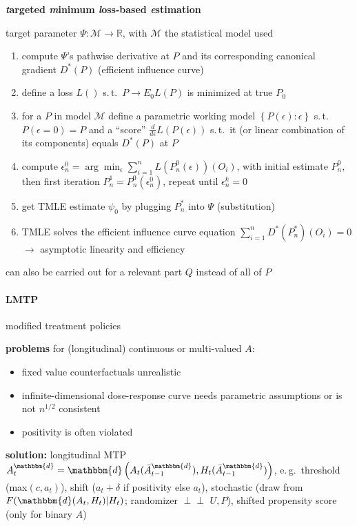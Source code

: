\documentclass[8pt,twoside]{extarticle}
\newcommand{\indep}{\perp \!\!\! \perp}
\begin{document}
\begin{multicols}{2}
 \textbf{\textit{t}argeted \textit{m}inimum \textit{l}oss-based \textit{e}stimation}


 target parameter $\Psi: \mathcal{M} \to \mathbb{R}$, with $\mathcal{M}$ the statistical model used

\begin{enumerate}[leftmargin=*, itemsep=0em, topsep=0pt, partopsep=0pt,parsep=0pt]
\item compute $\Psi$'s pathwise derivative at $P$ and its corresponding canonical gradient $D^*(P)$ (efficient influence curve)
\item define a loss $L()$ s.\,t.\ $P\to E_0L(P)$ is minimized at true $P_0$ 
\item for a $P$ in model $\mathcal{M}$ define a parametric working model $\left\{P(\epsilon):\epsilon\right\}$ s.\,t.\ $P(\epsilon=0)=P$ and a ``score'' $\frac{d}{d\epsilon}L(P(\epsilon))$ s.\,t.\ it (or linear combination of its components) equals $D^*(P)$ at $P$ 
\item  compute $\epsilon_n^0{=}\arg\min_\epsilon\! \sum_{i=1}^n \! L(P_n^0(\epsilon))(O_i)$, with initial estimate $P_n^0$, then  first iteration $P^1_n=P_n^0(\epsilon_n^0)$, repeat until $\epsilon^k_n=0$ 
\item get TMLE estimate $\psi_0$ by plugging $P^*_n$ into $\Psi$ (substitution)
\item  TMLE solves the efficient influence curve equation $\sum_{i=1}^n D^*(P^*_n)(O_i)=0$ $\to$ asymptotic linearity and efficiency
\end{enumerate}
can also be carried out for a relevant part $Q$ instead of all of $P$





\paragraph{LMTP}  \citep{diaz2021nonparametric} modified treatment policies


 \textbf{problems} for (longitudinal) continuous or multi-valued $A$:
\begin{itemize}[leftmargin=*, itemsep=0em, topsep=0pt, partopsep=0pt,parsep=0pt]
\item fixed value counterfactuals unrealistic
\item infinite-dimensional dose-response curve needs parametric assumptions or is not $n^{1/2}$ consistent
\item positivity is often violated 
\end{itemize}
\textbf{solution:} longitudinal MTP $A_t^{\mathbbm{d}} = \mathbbm{d}\left(A_t(\bar{A}_{t-1}^{\mathbbm{d}}), H_t(\bar{A}_{t-1}^\mathbbm{d})\right)$, e.\,g.\ threshold (max$(c,a_t)$), shift ($a_t + \delta$ if positivity else $a_t$), stochastic (draw from $F(\mathbbm{d}(A_t,H_t)|H_t)$; randomizer $\indep$ $U, P$), shifted propensity score (only for binary $A$)


\end{multicols}
\end{document}
